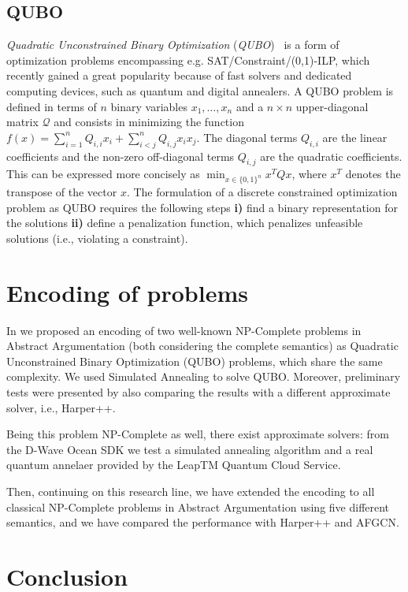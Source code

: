 \documentclass[conference]{IEEEtran}
\begin{document}
\subsection{QUBO}\label{sect:qubo}
\emph{Quadratic Unconstrained Binary Optimization} (\emph{QUBO})~\cite{glover,glover2} is a
form of optimization problems encompassing e.g. SAT/Constraint/(0,1)-ILP, which  recently gained a great popularity because of fast solvers and dedicated computing devices, such as
quantum and digital annealers. 
A QUBO problem is defined in terms of $n$ binary variables $x_1,\dots,x_n$
and a $n\times n$ upper-diagonal matrix $\mathcal{Q}$ and consists in 
minimizing the function $f(x) = \sum_{i=1}^n Q_{i,i} x_i + \sum_{i < j}^n Q_{i,j} x_i x_j$.
The diagonal terms $Q_{i,i}$ are the linear coefficients and the non-zero off-diagonal terms $Q_{i,j}$
are the quadratic coefficients. This can be expressed more concisely as $\min_{x \in \{0,1\}^n} x^T Q x$, where $x^T$ denotes the transpose of the vector $x$. The formulation of a discrete constrained optimization problem as QUBO requires
the following steps {\bf i)}  find a binary representation for the solutions {\bf ii)}  define a penalization function, which penalizes unfeasible solutions (i.e., violating a constraint).

\section{Encoding of problems}\label{sect:encoding}
In \cite{pricai22} we proposed an encoding of two well-known NP-Complete problems in Abstract Argumentation (both considering the complete semantics) as Quadratic Unconstrained Binary Optimization (QUBO) problems, which share the same complexity.  We used Simulated Annealing  to solve QUBO. Moreover, preliminary tests were presented by also comparing the results with a different approximate solver, i.e., Harper++. 

 Being this problem NP-Complete as well, there exist approximate solvers: from the D-Wave Ocean SDK we test a simulated annealing algorithm and a real quantum annelaer provided by the LeapTM Quantum Cloud Service.

Then, continuing on this research line, we have extended the encoding to all classical NP-Complete problems in Abstract Argumentation using five different semantics, and we have  compared the performance with Harper++ and AFGCN. 


\section{Conclusion}\label{sec:conclusion}




\end{document}
